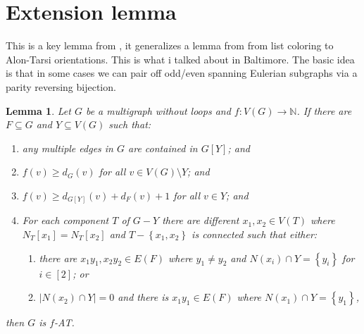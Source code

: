 \documentclass[12pt]{article}
\theoremstyle{plain}
\newtheorem{lem}[thm]{Lemma}
\theoremstyle{definition}
\theoremstyle{remark}
\newcommand{\IN}{\mathbb{N}}
\newcommand{\set}[1]{\left\{ #1 \right\}}
\newcommand{\card}[1]{\left|#1\right|}
\newcommand{\func}[3]{#1\colon #2 \rightarrow #3}
\newcommand{\irange}[1]{\left[#1\right]}
\begin{document}
\section{Extension lemma}
This is a key lemma from \cite{OreVizing}, it generalizes a lemma from \cite{kostochkastiebitzedgesincriticalgraph} from list coloring to Alon-Tarsi orientations.  
This is what i talked about in Baltimore.  The basic idea is that in some cases we can pair off odd/even spanning Eulerian subgraphs via a parity reversing bijection.

\begin{lem}\label{GeneralEulerLemma}
	Let $G$ be a multigraph without loops and $\func{f}{V(G)}{\IN}$. If there are $F \subseteq G$ and
	$Y \subseteq V(G)$ such that:
	\begin{enumerate}
		\item any multiple edges in $G$ are contained in $G[Y]$; and
		\item $f(v) \ge d_G(v)$ for all $v \in V(G) \setminus Y$; and
		\item $f(v) \ge d_{G[Y]}(v) + d_F(v) + 1$ for all $v \in Y$; and
		\item For each component $T$ of $G-Y$ there are different $x_1, x_2 \in V(T)$ where $N_T[x_1] = N_T[x_2]$ and $T - \set{x_1, x_2}$ is connected such that either:
		\begin{enumerate}
			\item there are $x_1y_1, x_2y_2 \in E(F)$ where $y_1 \ne y_2$ and $N(x_i) \cap Y = \set{y_i}$ for $i \in \irange{2}$; or
			\item $\card{N(x_2) \cap Y} = 0$ and there is $x_1y_1 \in E(F)$ where $N(x_1) \cap Y = \set{y_1}$,
		\end{enumerate}
	\end{enumerate}
	
	\noindent then $G$ is $f$-AT.
\end{lem}
\end{document}
